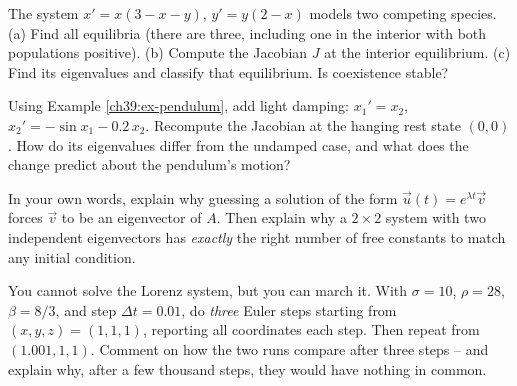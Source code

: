 \begin{exercise}
The system $x' = x(3 - x - y)$, $y' = y(2 - x)$ models two competing species.
(a) Find all equilibria (there are three, including one in the interior with both
populations positive). (b) Compute the Jacobian $J$ at the interior equilibrium.
(c) Find its eigenvalues and classify that equilibrium. Is coexistence stable?
\end{exercise}

\begin{exercise}
Using Example \ref{ch39:ex-pendulum}, add light damping: $x_1' = x_2$, $x_2' =
-\sin x_1 - 0.2\,x_2$. Recompute the Jacobian at the hanging rest state $(0,0)$.
How do its eigenvalues differ from the undamped case, and what does the change
predict about the pendulum's motion?
\end{exercise}

\begin{exercise}
In your own words, explain why guessing a solution of the form $\vec u(t) =
e^{\lambda t}\vec v$ forces $\vec v$ to be an eigenvector of $A$. Then explain
why a $2\times2$ system with two independent eigenvectors has \emph{exactly} the
right number of free constants to match any initial condition.
\end{exercise}

\begin{exercise}
You cannot solve the Lorenz system, but you can march it. With $\sigma=10$,
$\rho=28$, $\beta=8/3$, and step $\Delta t = 0.01$, do \emph{three} Euler steps
starting from $(x,y,z) = (1,1,1)$, reporting all coordinates each step. Then
repeat from $(1.001, 1, 1)$. Comment on how the two runs compare after three
steps -- and explain why, after a few thousand steps, they would have nothing in
common.
\end{exercise}
